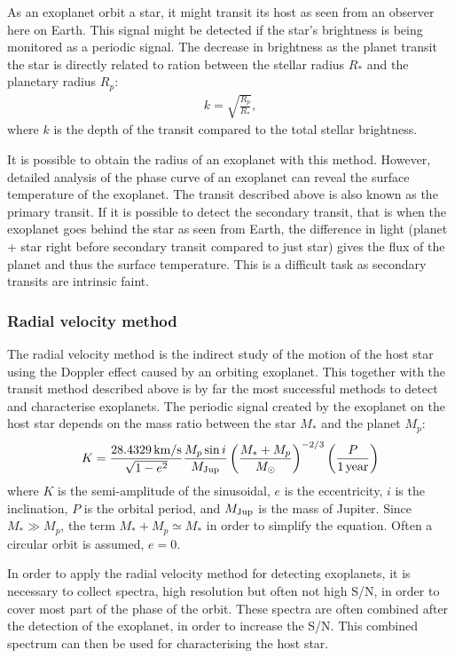 As an exoplanet orbit a star, it might transit its host as seen from an observer here on Earth. This
signal might be detected if the star's brightness is being monitored as a periodic signal. The
decrease in brightness as the planet transit the star is directly related to ration between the
stellar radius $R_\ast$ and the planetary radius $R_p$:
\begin{align}
  k = \sqrt{\frac{R_p}{R_\ast}},
\end{align}
where $k$ is the depth of the transit compared to the total stellar brightness.

It is possible to obtain the radius of an exoplanet with this method. However, detailed analysis of
the phase curve of an exoplanet can reveal the surface temperature of the exoplanet. The transit
described above is also known as the primary transit. If it is possible to detect the secondary
transit, that is when the exoplanet goes behind the star as seen from Earth, the difference in light
(planet + star right before secondary transit compared to just star) gives the flux of the planet
and thus the surface temperature. This is a difficult task as secondary transits are intrinsic
faint.


\subsubsection{Radial velocity method}

The radial velocity method is the indirect study of the motion of the host star using the Doppler
effect caused by an orbiting exoplanet. This together with the transit method described above is by
far the most successful methods to detect and characterise exoplanets. The periodic signal created
by the exoplanet on the host star depends on the mass ratio between the star $M_\ast$ and the planet
$M_p$:
\begin{align}
  K = \frac{\SI{28.4329}{km/s}}{\sqrt{1-e^2}} \frac{M_p\sin i}{M_\mathrm{Jup}} \left( \frac{M_\ast+M_p}{M_\odot} \right)^{-2/3} \left(\frac{P}{\SI{1}{year}}\right)
\end{align}
where $K$ is the semi-amplitude of the sinusoidal, $e$ is the eccentricity, $i$ is the inclination,
$P$ is the orbital period, and $M_\mathrm{Jup}$ is the mass of Jupiter. Since $M_\ast \gg M_p$, the term
$M_\ast+M_p\simeq M_\ast$ in order to simplify the equation. Often a circular orbit is assumed,
$e=0$.

In order to apply the radial velocity method for detecting exoplanets, it is necessary to collect
spectra, high resolution but often not high S/N, in order to cover most part of the phase of the
orbit. These spectra are often combined after the detection of the exoplanet, in order to increase
the S/N. This combined spectrum can then be used for characterising the host star.

